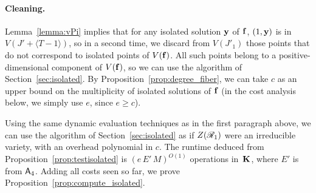 \documentclass[12pt]{article}
\begin{document}
\paragraph{Cleaning.}
Lemma~\ref{lemma:vPi} implies that for any isolated solution $\mathbf{y}$ of
$\mathbf{f}$, $(1,\mathbf{y})$ is in $V(J' + \langle T-1\rangle)$, so in a second
time, we discard from $V(J'_1)$ those points that do not correspond to
isolated points of $V(\mathbf{f})$. All such points belong to a
positive-dimensional component of $V(\mathbf{f})$, so we can use the algorithm
of Section~\ref{sec:isolated}. By Proposition~\ref{prop:degree_fiber},
we can take $c$ as an upper bound on the multiplicity of isolated
solutions of $\mathbf{f}$ (in the cost analysis below, we simply use $e$, 
since $e \ge c$).

Using the same dynamic evaluation techniques as in the first paragraph
above, we can use the algorithm of Section~\ref{sec:isolated} as if
$Z(\mathscr{R}_1)$ were an irreducible variety, with an overhead polynomial
in $c$. The runtime deduced from Proposition~\ref{prop:testisolated}
is $(e\,E'\,M)^{O(1)}$ operations in~$\mathbf{K}$, where $E'$ is from ${\sf
  A}_4$. Adding all costs seen so far, we prove
Proposition~\ref{prop:compute_isolated}.

 
\end{document}
